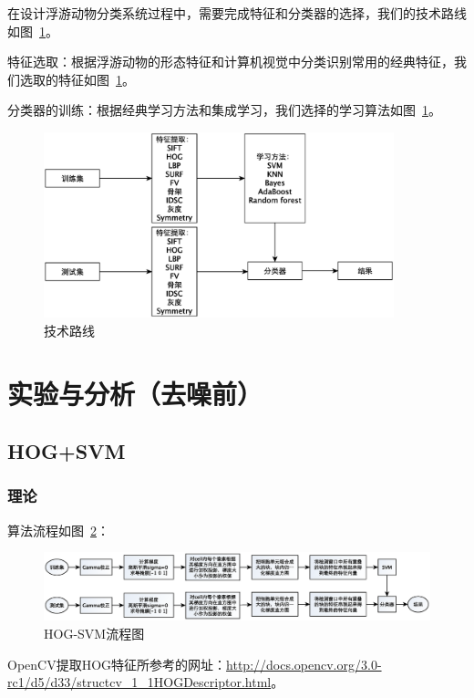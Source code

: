 \documentclass[12pt]{article}
\begin{document}
在设计浮游动物分类系统过程中，需要完成特征和分类器的选择，我们的技术路线如图~\ref{fig:TechnicalRoute}。

特征选取：根据浮游动物的形态特征和计算机视觉中分类识别常用的经典特征，我们选取的特征如图~\ref{fig:TechnicalRoute}。

分类器的训练：根据经典学习方法和集成学习，我们选择的学习算法如图~\ref{fig:TechnicalRoute}。

    \begin{figure}[!ht]
    \centering
    \includegraphics[width=4in]{TechnicalRoute}
    \caption{技术路线}
    \label{fig:TechnicalRoute}
    \end{figure}

\section{实验与分析（去噪前）}

\subsection{HOG+SVM}

\subsubsection{理论}

算法流程如图~\ref{fig: HOG-flowchart}：

\begin{figure}[!ht]
\centering
\includegraphics[width=1.0\linewidth]{HOG-flowchart.eps}
\caption{HOG-SVM流程图}
\label{fig: HOG-flowchart}
\end{figure}

OpenCV提取HOG特征所参考的网址：\url{http://docs.opencv.org/3.0-rc1/d5/d33/structcv_1_1HOGDescriptor.html}。
\end{document}
